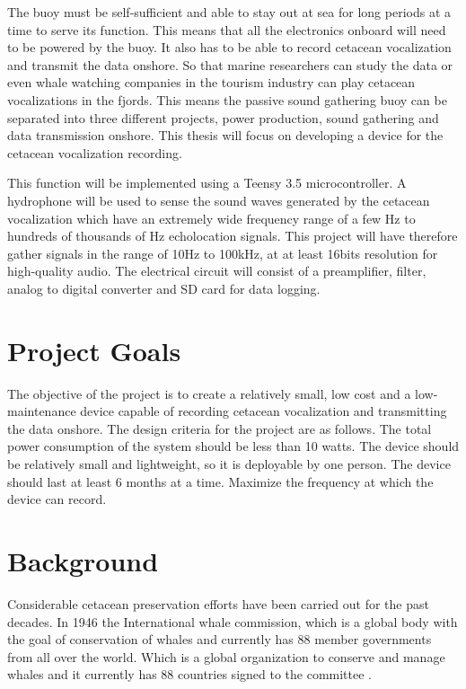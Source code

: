 The buoy must be self-sufficient and able to stay out at sea for long periods at a time to serve its function.
This means that all the electronics onboard will need to be powered by the buoy.
It also has to be able to record cetacean vocalization and transmit the data onshore.
So that marine researchers can study the data or even whale watching companies in the tourism industry can play cetacean vocalizations in the fjords.
This means the passive sound gathering buoy can be separated into three different projects, power production, sound gathering and data transmission onshore.
This thesis will focus on developing a device for the cetacean vocalization recording.

This function will be implemented using a Teensy 3.5 microcontroller.
A hydrophone will be used to sense the sound waves generated by the cetacean vocalization which have an extremely wide frequency range of a few Hz to hundreds of thousands of Hz echolocation signals. This project will have therefore gather signals in the range of 10Hz to 100kHz, at at least 16bits resolution for high-quality audio.
The electrical circuit will consist of a preamplifier, filter, analog to digital converter and SD card for data logging.

\section{Project Goals}

The objective of the project is to create a relatively small, low cost and a low-maintenance device capable of recording cetacean vocalization and transmitting the data onshore.
The design criteria for the project are as follows.
The total power consumption of the system should be less than 10 watts. 
The device should be relatively small and lightweight, so it is deployable by one person.
The device should last at least 6 months at a time.
Maximize the frequency at which the device can record.
\clearpage

\section{Background}

Considerable cetacean preservation efforts have been carried out for the past decades.
In 1946 the International whale commission, which is a global body with the goal of conservation of whales and currently has 88 member governments from all over the world.
Which is a global organization to conserve and manage whales and it currently has 88 countries signed to the committee \cite{noauthor_iwc_nodate}.

